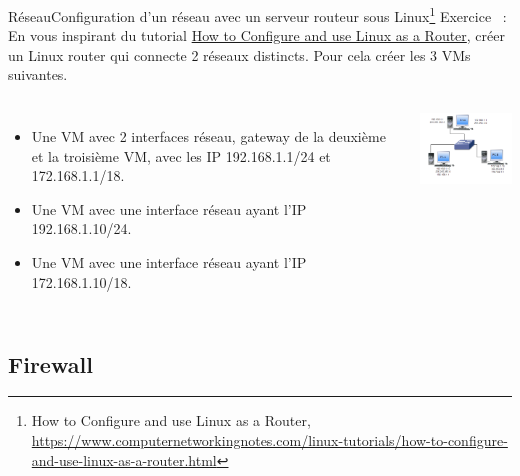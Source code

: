 \documentclass{beamer}
\begin{document}
    \begin{frame}{Réseau}{Configuration d'un réseau avec un serveur routeur sous Linux\footnote{How to Configure and use Linux as a Router, \url{https://www.computernetworkingnotes.com/linux-tutorials/how-to-configure-and-use-linux-as-a-router.html}}}
        Exercice \execcounterdispinc{}~:
        En vous inspirant du tutorial \href{https://www.computernetworkingnotes.com/linux-tutorials/how-to-configure-and-use-linux-as-a-router.htmlsky}{How to Configure and use Linux as a Router}, créer un Linux router qui connecte 2 réseaux distincts.
        Pour cela créer les 3 VMs suivantes.
        \begin{columns}
            \begin{itemize}
                \item Une VM avec 2 interfaces réseau, gateway de la deuxième et la troisième VM, avec les IP 192.168.1.1/24 et 172.168.1.1/18.
                \item Une VM avec une interface réseau ayant l'IP 192.168.1.10/24.
                \item Une VM avec une interface réseau ayant l'IP 172.168.1.10/18.
            \end{itemize}
            \centering
            \includegraphics[width=5cm]{image/exercice-routing}
        \end{columns}
    \end{frame}

    \subsection{Firewall}\label{subsec:firewall}
\end{document}
